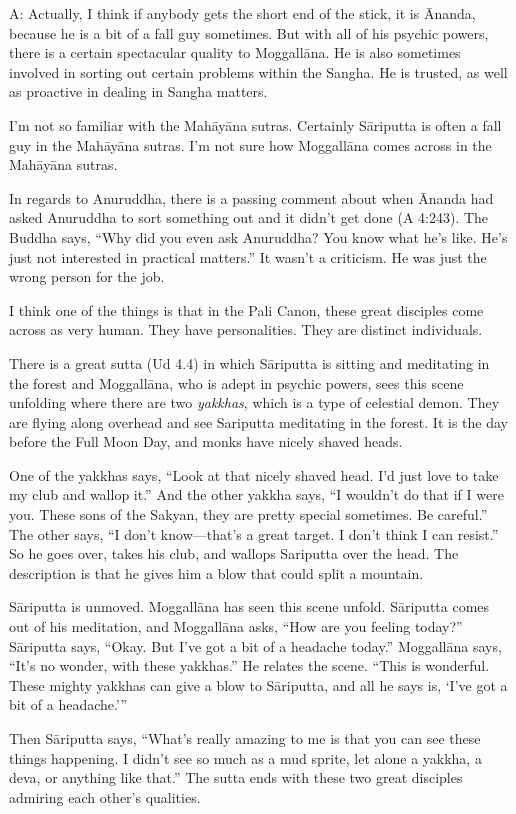 \qaspace
A: Actually, I think if anybody gets the short end of the stick, it is
Ānanda, because he is a bit of a fall guy sometimes. But with all of his
psychic powers, there is a certain spectacular quality to Moggallāna. He
is also sometimes involved in sorting out certain problems within the
Sangha. He is trusted, as well as proactive in dealing in Sangha
matters.

I’m not so familiar with the Mahāyāna sutras. Certainly Sāriputta is
often a fall guy in the Mahāyāna sutras. I’m not sure how Moggallāna
comes across in the Mahāyāna sutras.

In regards to Anuruddha, there is a passing comment about when Ānanda
had asked Anuruddha to sort something out and it didn’t get done (A
4:243). The Buddha says, “Why did you even ask Anuruddha? You know what
he’s like. He’s just not interested in practical matters.” It wasn’t a
criticism. He was just the wrong person for the job.

I think one of the things is that in the Pali Canon, these great
disciples come across as very human. They have personalities. They are
distinct individuals.

There is a great sutta (Ud 4.4) in which Sāriputta is sitting and
meditating in the forest and Moggallāna, who is adept in psychic powers,
sees this scene unfolding where there are two \emph{yakkhas}, which is a
type of celestial demon. They are flying along overhead and see
Sariputta meditating in the forest. It is the day before the Full Moon
Day, and monks have nicely shaved heads.

One of the yakkhas says, “Look at that nicely shaved head. I’d just love
to take my club and wallop it.” And the other yakkha says, “I wouldn’t
do that if I were you. These sons of the Sakyan, they are pretty special
sometimes. Be careful.” The other says, “I don’t know—that’s a great
target. I don’t think I can resist.” So he goes over, takes his club,
and wallops Sariputta over the head. The description is that he gives
him a blow that could split a mountain.

Sāriputta is unmoved. Moggallāna has seen this scene unfold. Sāriputta
comes out of his meditation, and Moggallāna asks, “How are you feeling
today?” Sāriputta says, “Okay. But I’ve got a bit of a headache today.”
Moggallāna says, “It’s no wonder, with these yakkhas.” He relates the
scene. “This is wonderful. These mighty yakkhas can give a blow to
Sāriputta, and all he says is, ‘I’ve got a bit of a headache.’”

Then Sāriputta says, “What’s really amazing to me is that you can see
these things happening. I didn’t see so much as a mud sprite, let alone
a yakkha, a deva, or anything like that.” The sutta ends with these two
great disciples admiring each other’s qualities.

